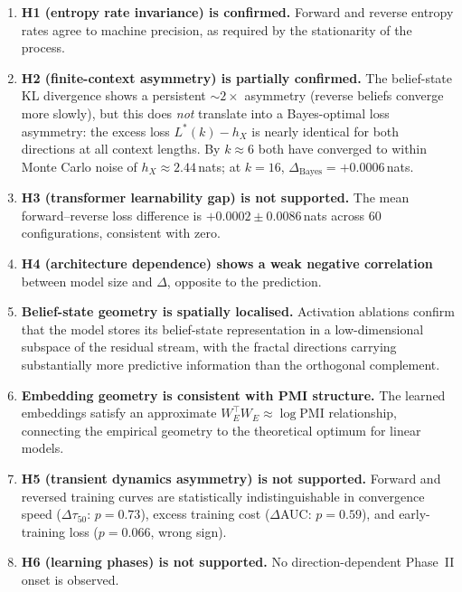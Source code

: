 \documentclass[11pt]{article}
\begin{document}
\begin{enumerate}
  \item \textbf{H1 (entropy rate invariance) is confirmed.}  Forward and reverse entropy rates agree to machine precision, as required by the stationarity of the process.

  \item \textbf{H2 (finite-context asymmetry) is partially confirmed.}  The belief-state KL divergence shows a persistent $\sim 2\times$ asymmetry (reverse beliefs converge more slowly), but this does \emph{not} translate into a Bayes-optimal loss asymmetry: the excess loss $L^*(k) - h_X$ is nearly identical for both directions at all context lengths.  By $k \approx 6$ both have converged to within Monte Carlo noise of $h_X \approx 2.44$\,nats; at $k = 16$, $\Delta_{\mathrm{Bayes}} = +0.0006$\,nats.

  \item \textbf{H3 (transformer learnability gap) is not supported.}  The mean forward--reverse loss difference is $+0.0002 \pm 0.0086$\,nats across 60 configurations, consistent with zero.

  \item \textbf{H4 (architecture dependence) shows a weak negative correlation} between model size and $\Delta$, opposite to the prediction.

  \item \textbf{Belief-state geometry is spatially localised.}  Activation ablations confirm that the model stores its belief-state representation in a low-dimensional subspace of the residual stream, with the fractal directions carrying substantially more predictive information than the orthogonal complement.

  \item \textbf{Embedding geometry is consistent with PMI structure.}  The learned embeddings satisfy an approximate $W_E^\top W_E \approx \log \mathrm{PMI}$ relationship, connecting the empirical geometry to the theoretical optimum for linear models.

  \item \textbf{H5 (transient dynamics asymmetry) is not supported.}  Forward and reversed training curves are statistically indistinguishable in convergence speed ($\Delta\tau_{50}$: $p = 0.73$), excess training cost ($\Delta$AUC: $p = 0.59$), and early-training loss ($p = 0.066$, wrong sign).

  \item \textbf{H6 (learning phases) is not supported.}  No direction-dependent Phase~II onset is observed.


\end{enumerate}
\end{document}
